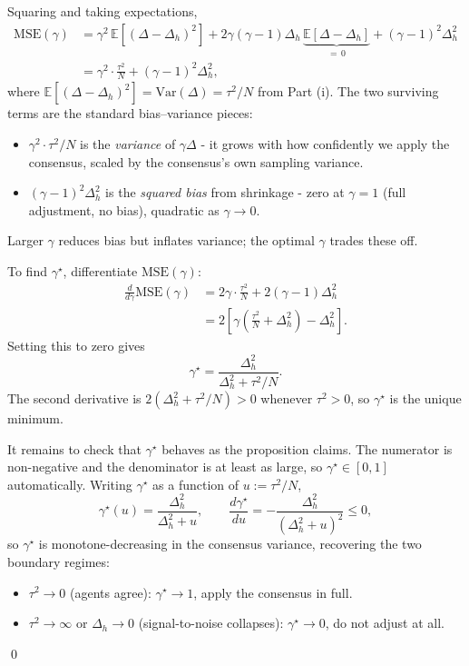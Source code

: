 \documentclass{article}
\begin{document}
Squaring and taking expectations,
\begin{align*}
\mathrm{MSE}(\gamma) 
&= \gamma^2\,\mathbb{E}[(\Delta - \Delta_h)^2] 
   + 2\gamma(\gamma-1)\Delta_h\,\underbrace{\mathbb{E}[\Delta - \Delta_h]}_{=\,0} 
   + (\gamma-1)^2\Delta_h^2 \\
&= \gamma^2 \cdot \frac{\tau^2}{N} + (\gamma-1)^2\Delta_h^2,
\end{align*}
where $\mathbb{E}[(\Delta - \Delta_h)^2] = \mathrm{Var}(\Delta) = \tau^2/N$ 
from Part (i). The two surviving terms are the standard bias--variance 
pieces:
\begin{itemize}
\item $\gamma^2 \cdot \tau^2/N$ is the \emph{variance} of 
$\gamma\Delta$ - it grows with how confidently we apply the 
consensus, scaled by the consensus's own sampling variance.
\item $(\gamma - 1)^2 \Delta_h^2$ is the \emph{squared bias} from 
shrinkage - zero at $\gamma = 1$ (full adjustment, no bias), 
quadratic as $\gamma \to 0$.
\end{itemize}
Larger $\gamma$ reduces bias but inflates variance; the optimal 
$\gamma$ trades these off.

To find $\gamma^\star$, differentiate $\mathrm{MSE}(\gamma)$:
\begin{align*}
\frac{d}{d\gamma}\mathrm{MSE}(\gamma) 
&= 2\gamma \cdot \frac{\tau^2}{N} + 2(\gamma - 1)\Delta_h^2 \\
&= 2\!\left[\gamma\!\left(\frac{\tau^2}{N} + \Delta_h^2\right) - 
\Delta_h^2\right].
\end{align*}
Setting this to zero gives
\begin{equation}
\gamma^\star = \frac{\Delta_h^2}{\Delta_h^2 + \tau^2/N}.
\label{eq:gamma-star-proof}
\end{equation}
The second derivative is $2(\Delta_h^2 + \tau^2/N) > 0$ whenever 
$\tau^2 > 0$, so $\gamma^\star$ is the unique minimum.

It remains to check that $\gamma^\star$ behaves as the proposition 
claims. The numerator is non-negative and the denominator is at 
least as large, so $\gamma^\star \in [0,1]$ automatically. Writing 
$\gamma^\star$ as a function of $u := \tau^2/N$,
\begin{equation*}
\gamma^\star(u) = \frac{\Delta_h^2}{\Delta_h^2 + u}, 
\qquad 
\frac{d\gamma^\star}{du} = -\frac{\Delta_h^2}{(\Delta_h^2 + u)^2} 
\leq 0,
\end{equation*}
so $\gamma^\star$ is monotone-decreasing in the consensus variance, 
recovering the two boundary regimes:
\begin{itemize}
\item $\tau^2 \to 0$ (agents agree): $\gamma^\star \to 1$, apply 
the consensus in full.
\item $\tau^2 \to \infty$ or $\Delta_h \to 0$ (signal-to-noise 
collapses): $\gamma^\star \to 0$, do not adjust at all.
\end{itemize}
\qed
\end{document}
